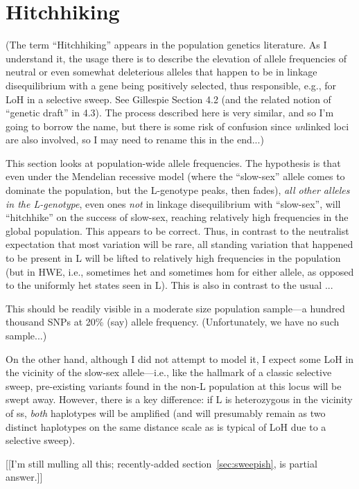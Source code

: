 \documentclass{article}\usepackage[]{graphicx}\usepackage[]{color}
\begin{document}
\section{Hitchhiking}
\label{sec:hitchhiking}

(The term ``Hitchhiking'' appears in the population genetics literature.  As I understand it, the
usage there is to describe the elevation of allele frequencies of neutral or even somewhat
deleterious alleles that happen to be in linkage disequilibrium with a gene being positively
selected, thus responsible, e.g., for LoH in a selective sweep.  See Gillespie Section 4.2 (and the
related notion of ``genetic draft'' in 4.3).  The process described here is very similar, and so I'm
going to borrow the name, but there is some risk of confusion since \textit{un}linked loci are also
involved, so I may need to rename this in the end...)

This section looks at population-wide allele frequencies.  The hypothesis is that even under the
Mendelian recessive model (where the ``slow-sex'' allele comes to dominate the population, but the
L-genotype peaks, then fades), \emph{all other alleles in the L-genotype}, even ones \textit{not} in
linkage disequilibrium with ``slow-sex'', will ``hitchhike'' on the success of slow-sex, reaching
relatively high frequencies in the global population.  This appears to be correct.  Thus, in
contrast to the neutralist expectation that most variation will be rare, all standing variation that
happened to be present in L will be lifted to relatively high frequencies in the population (but in
HWE, i.e., sometimes het and sometimes hom for either allele, as opposed to the uniformly het states
seen in L).  This is also in contrast to the usual ...

This should be readily visible in a moderate size population sample---a hundred thousand SNPs at
20\% (say) allele frequency.  (Unfortunately, we have no such sample...)

On the other hand, although I did not attempt to model it, I expect some LoH in the vicinity of the
slow-sex allele---i.e., like the hallmark of a classic selective sweep, pre-existing variants found
in the non-L population at this locus will be swept away.  However, there is a key difference: if 
L is heterozygous in the vicinity of ss, \textit{both} haplotypes will be amplified (and will 
presumably remain as two distinct haplotypes on the same distance scale as is typical of LoH due to
a selective sweep). 

[[I'm still mulling all this; recently-added section~\ref{sec:sweepish}, is partial answer.]]
\end{document}
